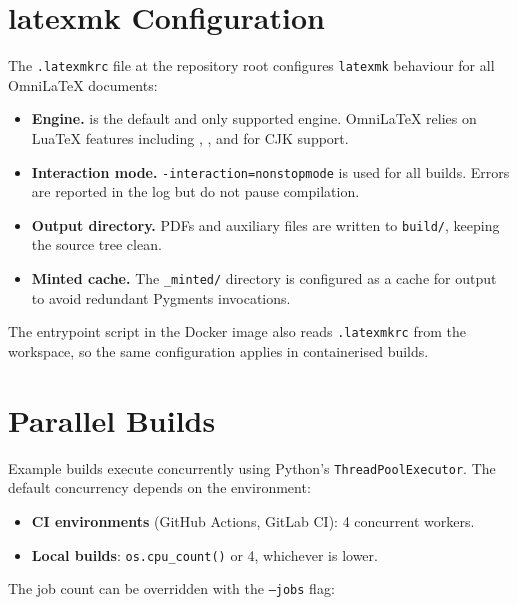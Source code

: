 \section{latexmk Configuration}

The \texttt{.latexmkrc} file at the repository root configures \texttt{latexmk}
behaviour for all OmniLaTeX documents:

\begin{itemize}
    \item \textbf{Engine.}   is the default and only
          supported engine.  OmniLaTeX relies on Lua\TeX{} features including
          , , and
           for CJK support.
    \item \textbf{Interaction mode.}  \texttt{-interaction=nonstopmode} is used
          for all builds.  Errors are reported in the log but do not pause
          compilation.
    \item \textbf{Output directory.}  PDFs and auxiliary files are written to
          \texttt{build/}, keeping the source tree clean.
    \item \textbf{Minted cache.}  The \texttt{\_minted/} directory is
          configured as a cache for  output to avoid
          redundant Pygments invocations.
\end{itemize}

The entrypoint script in the Docker image also reads \texttt{.latexmkrc} from
the workspace, so the same configuration applies in containerised builds.

\section{Parallel Builds}
\label{sec:parallel-builds}

Example builds execute concurrently using Python's
\texttt{ThreadPoolExecutor}.  The default concurrency depends on the
environment:

\begin{itemize}
    \item \textbf{CI environments} (GitHub Actions, GitLab CI): 4 concurrent
          workers.
    \item \textbf{Local builds}: \texttt{os.cpu\_count()} or 4, whichever is
          lower.
\end{itemize}

The job count can be overridden with the \texttt{--jobs} flag:

